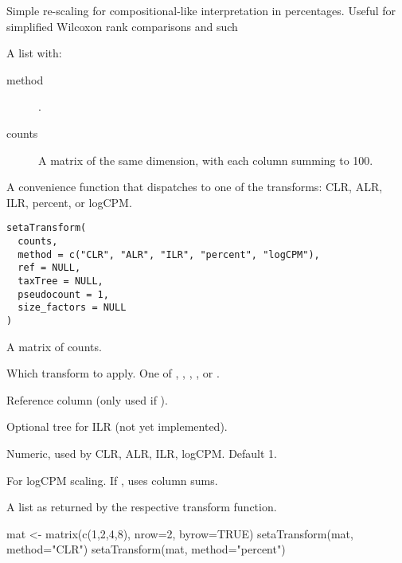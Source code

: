 \documentclass[a4paper]{book}
\begin{document}
%
\begin{Details}
Simple re-scaling for compositional-like interpretation in percentages.
Useful for simplified Wilcoxon rank comparisons and such
\end{Details}
%
\begin{Value}
A list with:
\begin{description}

\item[method] .
\item[counts] A matrix of the same dimension, with each column summing to 100.

\end{description}

\end{Value}
%
\begin{Examples}
\end{Examples}
%
\begin{Description}
A convenience function that dispatches to one of the transforms:
CLR, ALR, ILR, percent, or logCPM.
\end{Description}
%
\begin{Usage}
\begin{verbatim}
setaTransform(
  counts,
  method = c("CLR", "ALR", "ILR", "percent", "logCPM"),
  ref = NULL,
  taxTree = NULL,
  pseudocount = 1,
  size_factors = NULL
)
\end{verbatim}
\end{Usage}
%
\begin{Arguments}
\begin{ldescription}
\item[\code{counts}] A matrix of counts.

\item[\code{method}] Which transform to apply. One of , ,
, , or .

\item[\code{ref}] Reference column (only used if ).

\item[\code{taxTree}] Optional tree for ILR (not yet implemented).

\item[\code{pseudocount}] Numeric, used by CLR, ALR, ILR, logCPM. Default 1.

\item[\code{size\_factors}] For logCPM scaling. If , uses column sums.
\end{ldescription}
\end{Arguments}
%
\begin{Value}
A list as returned by the respective transform function.
\end{Value}
%
\begin{Examples}
\begin{ExampleCode}
mat <- matrix(c(1,2,4,8), nrow=2, byrow=TRUE)
setaTransform(mat, method="CLR")
setaTransform(mat, method="percent")

\end{ExampleCode}
\end{Examples}
\printindex{}
\end{document}
